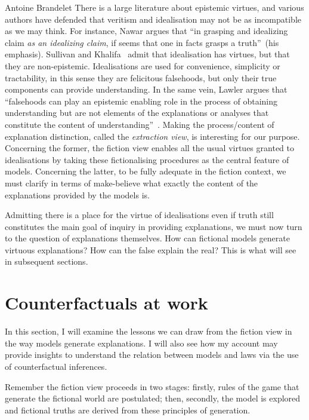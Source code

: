 \begin{artengenv}{Antoine Brandelet}
There is a large literature about epistemic virtues, and various authors have defended that veritism and idealisation may not be as incompatible as we may think. For instance, Nawar argues that ``in grasping and idealizing claim \textit{as an idealizing claim}, if seems that one in facts grasps a truth''~\parencite{Nawar2019}(his emphasis). Sullivan and Khalifa~\parencite*{Sullivan2019} admit that idealisation has virtues, but that they are non-epistemic. Idealisations are used for convenience, simplicity or tractability, in this sense they are felicitous falsehoods, but only their true components can provide understanding. In the same vein, Lawler argues that ``falsehoods can play an epistemic enabling role in the process of obtaining understanding but are not elements of the explanations or analyses that constitute the content of understanding''~\parencite{Lawler2019}. Making the process/content of explanation distinction, called the \textit{extraction view}, is interesting for our purpose. Concerning the former, the fiction view enables all the usual virtues granted to idealisations by taking these fictionalising procedures as the central feature of models. Concerning the latter, to be fully adequate in the fiction context, we must clarify in terms of make-believe what exactly the content of the explanations provided by the models is.

Admitting there is a place for the virtue of idealisations even if truth still constitutes the main goal of inquiry in providing explanations, we must now turn to the question of explanations themselves. How can fictional models generate virtuous explanations? How can the false explain the real? This is what will see in subsequent sections.

\section{Counterfactuals at work}\label{sec:counterfactuals}


In this section, I will examine the lessons we can draw from the fiction view in the way models generate explanations. I will also see how my account may provide insights to understand the relation between models and laws via the use of counterfactual inferences.

Remember the fiction view proceeds in two stages: firstly, rules of the game that generate the fictional world are postulated; then, secondly, the model is explored and fictional truths are derived from these principles of generation.


\end{artengenv}
